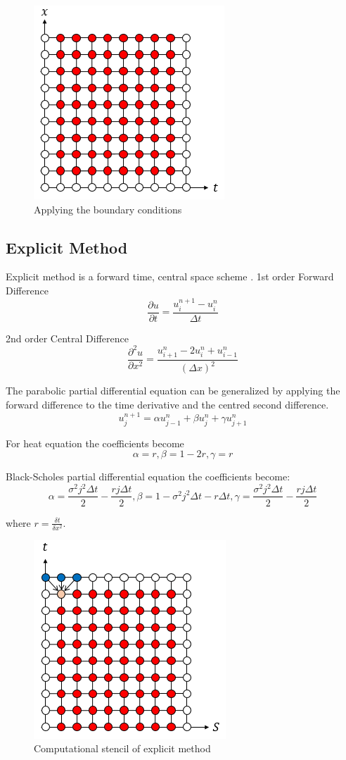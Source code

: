 \documentclass[12pt, oneside]{book}
\theoremstyle{plain}
\theoremstyle{definition}
\begin{document}
    \begin{figure}[!htb]
        \centering
            \includegraphics[scale=0.9]{Initial.png}
        \caption{Applying the boundary conditions}
    \end{figure}

\subsection{Explicit Method}
Explicit method is a forward time, central space scheme .
1st order Forward Difference
$$ \frac{\partial u}{\partial t} = \frac{u^{n+1}_i - u^n_i}{\Delta t} $$

2nd order Central Difference 
$$ \frac{\partial^2 u}{\partial x^2} = \frac{u^n_{i+1}- 2u^n_i + u^n_{i-1}}{(\Delta x)^2} $$

The parabolic partial differential equation can be generalized by applying the forward difference to the time derivative and the centred second difference.
$$ u_j^{n+1} = \alpha u_{j-1}^{n} + \beta u_{j}^{n} + \gamma u_{j+1}^{n} $$

For heat equation the coefficients become
$$ \alpha =  r, \beta = 1 - 2r, \gamma = r $$

Black-Scholes partial differential equation the coefficients become:
$$ \alpha =  \frac{\sigma^2 j^2 \Delta t}{2} - \frac{r j \Delta t}{2}, \beta = 1 - \sigma^2 j^2 \Delta t - r \Delta t, \gamma = \frac{\sigma^2 j^2 \Delta t}{2} - \frac{r j \Delta t}{2} $$

where $ r = \frac{\delta t}{\delta x^2} $.

    \begin{figure}[!htb]
        \centering
            \includegraphics[scale=0.9]{Explicit.png}
        \caption{Computational stencil of explicit method}
    \end{figure}
\end{document}
